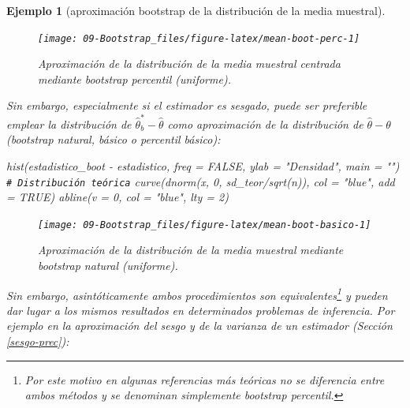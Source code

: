 \documentclass[
  10pt,
]{book}
\newenvironment{Shaded}{\begin{snugshade}}{\end{snugshade}}
\newcommand{\AttributeTok}[1]{\textcolor[rgb]{0.77,0.63,0.00}{#1}}
\newcommand{\CommentTok}[1]{\textcolor[rgb]{0.56,0.35,0.01}{\textit{#1}}}
\newcommand{\ConstantTok}[1]{\textcolor[rgb]{0.00,0.00,0.00}{#1}}
\newcommand{\DecValTok}[1]{\textcolor[rgb]{0.00,0.00,0.81}{#1}}
\newcommand{\FunctionTok}[1]{\textcolor[rgb]{0.00,0.00,0.00}{#1}}
\newcommand{\NormalTok}[1]{#1}
\newcommand{\SpecialCharTok}[1]{\textcolor[rgb]{0.00,0.00,0.00}{#1}}
\newcommand{\StringTok}[1]{\textcolor[rgb]{0.31,0.60,0.02}{#1}}
\theoremstyle{break}
\newtheorem{example}{Ejemplo}[chapter]
\theoremstyle{nonumberplain}
\renewcommand{\CommentTok}[1]{\textcolor[rgb]{0.41,0.41,0.41}{\texttt{#1}}}
\let\oldfootnote\footnote
\renewcommand\footnote[1]{\oldfootnote{\hspace{2mm}#1}}
\begin{document}
\begin{example}[aproximación bootstrap de la distribución de la media muestral]
\begin{figure}[!htbp]

{\centering \texttt{[image: 09-Bootstrap\_files/figure-latex/mean-boot-perc-1]} 

}

\caption{Aproximación de la distribución de la media muestral centrada mediante bootstrap percentil (uniforme).}\label{fig:mean-boot-perc}
\end{figure}

Sin embargo, especialmente si el estimador es sesgado, puede ser preferible emplear la distribución de \(\hat{\theta}_{b}^{\ast }-\hat{\theta}\) como aproximación de la distribución de \(\hat{\theta}-\theta\) (bootstrap natural, básico o percentil básico):

\begin{Shaded}
\begin{Highlighting}[]
\FunctionTok{hist}\NormalTok{(estadistico\_boot }\SpecialCharTok{{-}}\NormalTok{ estadistico, }\AttributeTok{freq =} \ConstantTok{FALSE}\NormalTok{, }
     \AttributeTok{ylab =} \StringTok{"Densidad"}\NormalTok{, }\AttributeTok{main =} \StringTok{""}\NormalTok{)}
\CommentTok{\# Distribución teórica}
\FunctionTok{curve}\NormalTok{(}\FunctionTok{dnorm}\NormalTok{(x, }\DecValTok{0}\NormalTok{, sd\_teor}\SpecialCharTok{/}\FunctionTok{sqrt}\NormalTok{(n)), }\AttributeTok{col =} \StringTok{"blue"}\NormalTok{, }\AttributeTok{add =} \ConstantTok{TRUE}\NormalTok{)}
\FunctionTok{abline}\NormalTok{(}\AttributeTok{v =} \DecValTok{0}\NormalTok{, }\AttributeTok{col =} \StringTok{"blue"}\NormalTok{, }\AttributeTok{lty =} \DecValTok{2}\NormalTok{)}
\end{Highlighting}
\end{Shaded}

\begin{figure}[!htbp]

{\centering \texttt{[image: 09-Bootstrap\_files/figure-latex/mean-boot-basico-1]} 

}

\caption{Aproximación de la distribución de la media muestral mediante bootstrap natural (uniforme).}\label{fig:mean-boot-basico}
\end{figure}

Sin embargo, asintóticamente ambos procedimientos son equivalentes\footnote{Por este motivo en algunas referencias más teóricas no se diferencia entre ambos métodos y se denominan simplemente bootstrap percentil.} y pueden dar lugar a los mismos resultados en determinados problemas de inferencia.
Por ejemplo en la aproximación del sesgo y de la varianza de un estimador (Sección \ref{sesgo-prec}):


\end{example}
\end{document}
